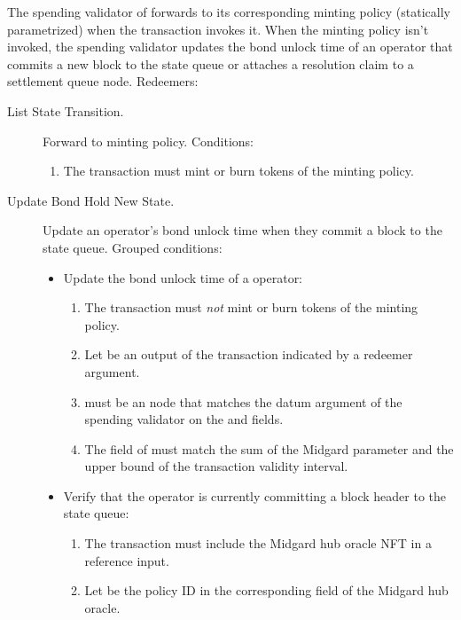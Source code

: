 \documentclass[../midgard.tex]{subfiles}
\begin{document}
The spending validator of  forwards to its corresponding minting policy (statically parametrized) when the transaction invokes it.
When the minting policy isn't invoked, the spending validator updates the bond unlock time of an operator that commits a new block to the state queue or attaches a resolution claim to a settlement queue node.
Redeemers:
\begin{description}
    \item[List State Transition.] Forward to minting policy.
      Conditions:
        \begin{enumerate}
            \item The transaction must mint or burn tokens of the  minting policy.
        \end{enumerate}
    \item[Update Bond Hold New State.] Update an operator's bond unlock time when they commit a block to the state queue.
      Grouped conditions:
        \begin{itemize}
            \item Update the bond unlock time of a operator:
            \begin{enumerate} 
                \item The transaction must \emph{not} mint or burn tokens of the  minting policy.
                \item Let  be an output of the transaction indicated by a redeemer argument.
                \item {} must be an  node that matches the datum argument of the spending validator on the  and  fields.
                \item The  field of  must match the sum of the Midgard  parameter and the upper bound of the transaction validity interval.
            \end{enumerate}
            \item Verify that the operator is currently committing a block header to the state queue:
            \begin{enumerate}[resume]
                \item The transaction must include the Midgard hub oracle NFT in a reference input.
                \item Let  be the policy ID in the corresponding field of the Midgard hub oracle.

\end{enumerate}
\end{itemize}
\end{description}
\end{document}
